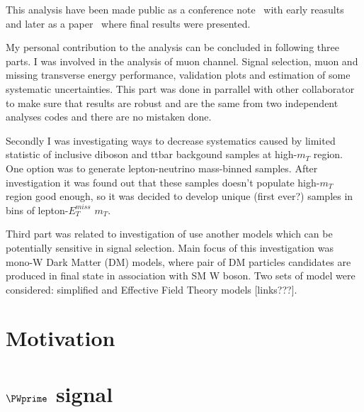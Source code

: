 This analysis have been made public as a conference note~\cite{ATLAS-CONF-2015-063} with early reasults and later as a paper~\cite{Aaboud:2016zkn} where final results were presented.

My personal contribution to the analysis can be concluded in following three parts.
I was involved in the analysis of muon channel. Signal selection, muon and missing transverse energy performance, validation plots and estimation of some systematic uncertainties.
This part was done in parrallel with other collaborator to make sure that results are robust and are the same from two independent analyses codes and there are no mistaken done.

Secondly I was investigating ways to decrease systematics caused by limited statistic of inclusive diboson and ttbar backgound samples at high-$m_{T}$ region.
One option was to generate lepton-neutrino mass-binned samples. After investigation it was found out that these samples doesn't populate high-$m_{T}$ region
good enough, so it was decided to develop unique (first ever?) samples in bins of lepton-$E_T^{miss} $ $m_T$.

Third part was related to investigation of use another models which can be potentially sensitive in signal selection.
Main focus of this investigation was mono-W Dark Matter (DM) models, where pair of DM particles candidates are produced in final state in association with SM W boson.
Two sets of model were considered: simplified and Effective Field Theory models [links???]. 




\section{Motivation}
\label{sec:wprimeIntro}


\section{$\PWprime$ signal}
\label{sec:wprimeSignal} 


